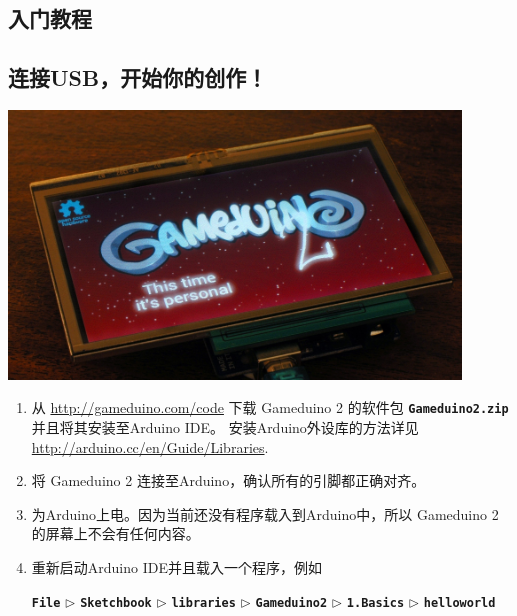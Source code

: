 \documentclass[10pt]{book}
\newcommand{\gdtwo}{Gameduino 2 }
\newcommand{\mach}[1]{\texttt{\textbf{#1}}}
\begin{document}
\begin{CJK}{UTF8}{gkai}
\vfill


\endgroup

\thispagestyle{empty}
\pagestyle{headings}

\tableofcontents

\part{入门教程}

\chapter{连接USB，开始你的创作！}

\begin{center}
\includegraphics[width=0.9\textwidth]{assets/plugin.jpg}
\end{center}

\begin{enumerate}

\item
从 \url{http://gameduino.com/code} 下载 \gdtwo 的软件包 \mach{Gameduino2.zip} 并且将其安装至Arduino IDE。
安装Arduino外设库的方法详见
\\
\url{http://arduino.cc/en/Guide/Libraries}.

\item
将 \gdtwo 连接至Arduino，确认所有的引脚都正确对齐。

\item
为Arduino上电。因为当前还没有程序载入到Arduino中，所以 \gdtwo 的屏幕上不会有任何内容。

\item
重新启动Arduino IDE并且载入一个程序，例如 \\
\begin{small}
\mach{File} $\triangleright$
\mach{Sketchbook} $\triangleright$
\mach{libraries} $\triangleright$
\mach{Gameduino2} $\triangleright$
\mach{1.Basics} $\triangleright$
\mach{helloworld}
\end{small}


\end{enumerate}
\end{CJK}
\end{document}
